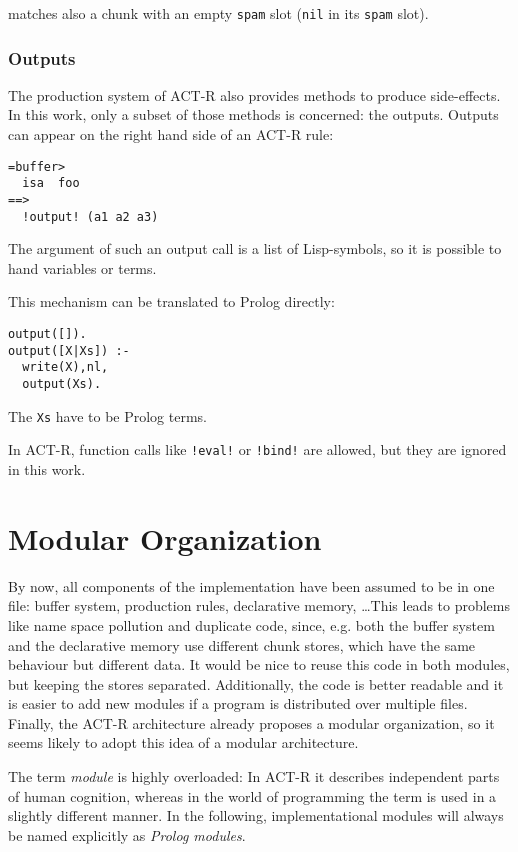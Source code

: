 matches also a chunk with an empty \lstinline|spam| slot (\lstinline|nil| in its \lstinline|spam| slot).

\subsubsection{Outputs}

The production system of ACT-R also provides methods to produce side-effects. In this work, only a subset of those methods is concerned: the outputs. Outputs can appear on the right hand side of an ACT-R rule:

\begin{lstlisting}
=buffer>
  isa  foo
==>
  !output! (a1 a2 a3)
\end{lstlisting}

The argument of such an output call is a list of Lisp-symbols, so it is possible to hand variables or terms.

This mechanism can be translated to Prolog directly:

\begin{lstlisting}
output([]).
output([X|Xs]) :-
  write(X),nl,
  output(Xs).
\end{lstlisting}

The \lstinline|Xs| have to be Prolog terms.

In ACT-R, function calls like \lstinline|!eval!| or \lstinline|!bind!| are allowed, but they are ignored in this work.

\section{Modular Organization}
\label{implementation:modular_organization}

By now, all components of the implementation have been assumed to be in one file: buffer system, production rules, declarative memory, \dots This leads to problems like name space pollution and duplicate code, since, e.g. both the buffer system and the declarative memory use different chunk stores, which have the same behaviour but different data. It would be nice to reuse this code in both modules, but keeping the stores separated. Additionally, the code is better readable and it is easier to add new modules if a program is distributed over multiple files. Finally, the ACT-R architecture already proposes a modular organization, so it seems likely to adopt this idea of a modular architecture.

The term \emph{module} is highly overloaded: In ACT-R it describes independent parts of human cognition, whereas in the world of programming the term is used in a slightly different manner. In the following, implementational modules will always be named explicitly as \emph{Prolog modules}.


